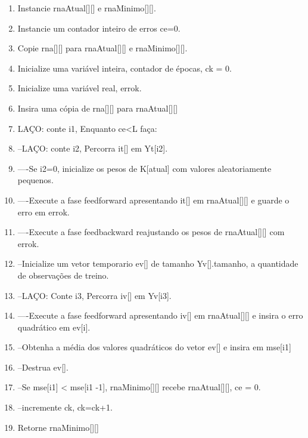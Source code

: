 \documentclass[	12pt, Times, openright, twoside, a4paper, english, brazil]{abntex2}
\begin{document}
            \begin{enumerate}
                \item Instancie rnaAtual[][] e rnaMinimo[][].
                \item Instancie um contador inteiro de erros ce=0.
                \item Copie rna[][] para rnaAtual[][] e rnaMinimo[][].
                \item Inicialize uma variável inteira, contador de épocas, ck = 0.
                \item Inicialize uma variável real, errok.
                \item Insira uma cópia de rna[][] para rnaAtual[][]
                
                \item LAÇO: conte i1, Enquanto ce<L faça:
                \item --LAÇO: conte i2, Percorra it[] em Yt[i2].
                \item ----Se i2=0, inicialize os pesos de K[atual] com valores aleatoriamente pequenos. 
                \item ----Execute a fase feedforward apresentando it[] em rnaAtual[][] e guarde o erro em errok.
                \item ----Execute a fase feedbackward reajustando os pesos de rnaAtual[][] com errok.

                \item --Inicialize um vetor temporario ev[] de tamanho Yv[].tamanho, a quantidade de observações de treino.

                \item --LAÇO: Conte i3, Percorra iv[] em Yv[i3].
                \item ----Execute a fase feedforward apresentando iv[] em rnaAtual[][] e insira o erro quadrático em ev[i].

                \item --Obtenha a média dos valores quadráticos do vetor ev[] e insira em mse[i1]
                \item --Destrua ev[].
                \item --Se mse[i1] < mse[i1 -1], rnaMinimo[][] recebe rnaAtual[][], ce = 0.
                \item --incremente ck, ck=ck+1.
                \item Retorne rnaMinimo[][]
            \end{enumerate}
\end{document}

